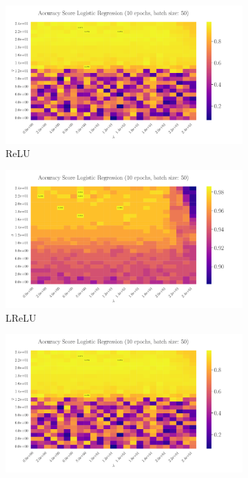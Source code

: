\documentclass[%
reprint,
amsmath,amssymb,
aps,
]{revtex4-2}
\begin{document}
\begin{figure}
	\begin{subfigure}{0.4353\textwidth}
		\includegraphics[width=\textwidth]{Python/Figures/LogReg25x25_epoch10_batchS50.pdf}
		\caption{ReLU}
		\label{fig:LogReg25x25_epoch10_bacthS50}
	\end{subfigure}
	\hfill
	\begin{subfigure}{0.4353\textwidth}
		\includegraphics[width=\textwidth]{Python/Figures/LogReg25x25_epoch10_batchS50_zoomed.pdf}
		\caption{LReLU}
		\label{fig:LogReg25x25_epoch10_bacthS50_zoomed}
	\end{subfigure}
	\hfill\newline
	\begin{subfigure}{0.4353\textwidth}
		\includegraphics[width=\textwidth]{Python/Figures/LogReg25x25_epoch10_batchS50.pdf}

\end{subfigure}
\end{figure}
\end{document}
